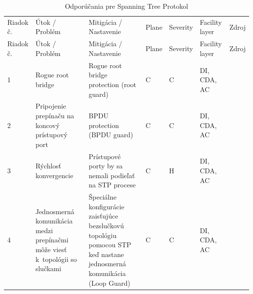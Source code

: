 \begin{longtable}[!htbp]{|C{2.5em}L{11em}L{11em}C{2.5em}C{4em}C{5em}L{2.5em}|}
	
	\caption{Odporúčania pre Spanning Tree Protokol}
	\label{tab:stp}\\ \hline
	\mbox{Riadok} č.&Útok / Problém	&Mitigácia / Nastavenie	&Plane	&Severity	&Facility layer	&Zdroj\\ \hhline{=======}
	\endfirsthead 
	\hline
	\centering
	
	Riadok č.	&Útok / Problém	&Mitigácia / Nastavenie	&Plane	&Severity	&Facility layer	&Zdroj\\ \hhline{=======}
	\endhead
	
	
	 1	&Rogue root bridge	& Rogue root bridge protection (root guard)	&C	&C	&DI,
	CDA,
	AC	& \cite{Vyncke2008}\\
	2	&Pripojenie prepínaču na koncový prístupový port	& BPDU protection (BPDU guard)	&C	&C	&DI,
	CDA,
	AC	& \cite{Vyncke2008}\\
	 3	&Rýchlosť konvergencie	&Prístupové porty by sa nemali podieľať na STP procese	&C	&H	&DI,
	CDA,
	AC	& \cite{Vyncke2008}\\
	4	&Jednosmerná komunikácia medzi prepínačmi môže viesť k~topológii so slučkami & Špeciálne konfigurácie zaisťujúce bezslučkovú topológiu pomocou STP keď nastane jednosmerná komunikácia (Loop Guard)	&C	&C	&DI,
	CDA,
	AC	& \cite{Tiso2012}\\
	
	\hline
	
\end{longtable}%



